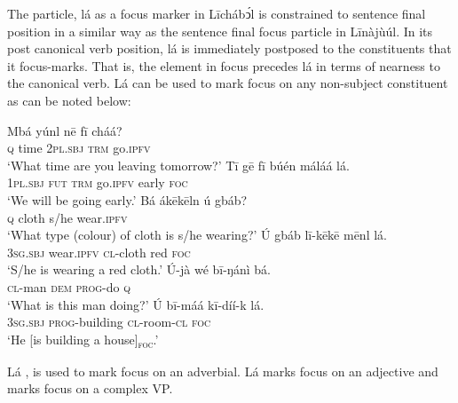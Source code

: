 \documentclass[output=paper,colorlinks,citecolor=brown]{langscibook}
\begin{document}
The particle, lá as a focus marker in Līchábͻ́l is constrained to sentence final position in a similar way as the sentence final focus particle in Līnàjùúl. In its post canonical verb position, lá is immediately postposed to the constituents that it focus-marks. That is, the element in focus precedes lá in terms of nearness to the canonical verb. Lá can be used to mark focus on any non-subject constituent as can be noted  below:

\ea%
    \label{ex:bisilki:26}
    \ea\label{ex:bisilki:26a}
        \ea\label{ex:bisilki:26ai}
        \gll    Mbá	yúnl	nē		fī	cháá?\\
                \textsc{q}	time	\textsc{2pl.sbj}	\textsc{trm}	go\textsc{.ipfv}\\
        \glt    ‘What time are you leaving tomorrow?’
        \ex\label{ex:bisilki:26aii}
        \gll    Tī		gē	fī	búén	máláá		lá.\\
                \textsc{1pl.sbj}	\textsc{fut}	\textsc{trm}	go\textsc{.ipfv}  early	\textsc{foc}\\
        \glt    ‘We will be going early.’
        \z
    \ex\label{ex:bisilki:26b}
        \ea\label{ex:bisilki:26bi}
        \gll    Bá	ákēkēln	ú	gbáb?\\
                \textsc{q}	cloth		s/he	wear\textsc{.ipfv}\\
        \glt    ‘What type (colour) of cloth is s/he wearing?’
        \ex\label{ex:bisilki:26bii}
        \gll    Ú	gbáb	lī-kēkē	mēnl		lá.\\
                \textsc{3sg.sbj}	wear\textsc{.ipfv}	\textsc{cl-}cloth	red	\textsc{foc}\\
        \glt    ‘S/he is wearing a red cloth.’
        \z
    \ex\label{ex:bisilki:26c}
        \ea\label{ex:bisilki:26ci}
        \gll    Ú-jà		wé	bī-ŋánì	bá.\\
                \textsc{cl-}man	\textsc{dem}	\textsc{prog-}do	\textsc{q}\\
        \glt    ‘What is this man doing?’
        \ex\label{ex:bisilki:26cii}
        \gll    Ú		bī-máá		kī-díí-k		lá.\\
                \textsc{3sg.sbj}	\textsc{prog-}building	\textsc{cl-}room\textsc{-cl}		\textsc{foc}\\
        \glt    ‘He [is building a house]\textsubscript{\textsc{foc}}.’
        \z
    
    \z
\z

Lá , is used to mark focus on an adverbial. Lá marks focus on an adjective and  marks focus on a complex VP.
\end{document}
